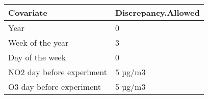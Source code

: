 \begin{table}[ht]
\centering
\begin{tabular}{ll}
  \hline
Covariate & Discrepancy.Allowed \\ 
  \hline
Year & 0 \\ 
  Week of the year & 3 \\ 
  Day of the week & 0 \\ 
  NO2 day before experiment & 5 µg/m3 \\ 
  O3 day before experiment & 5 µg/m3 \\ 
   \hline
\end{tabular}
\end{table}
